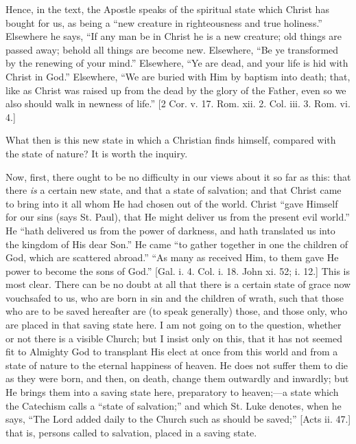 Hence, in the text, the Apostle speaks of the spiritual state which
Christ has bought for us, as being a ``new creature in
righteousness and true holiness.'' Elsewhere he says, ``If any
man be in Christ he is a new creature; old things are passed away;
behold all things are become new. Elsewhere, ``Be ye transformed
by the renewing of your mind.'' Elsewhere, ``Ye are dead, and
your life is hid with Christ in God.'' Elsewhere, ``We are
buried with Him by baptism into death; that, like as Christ was raised
up from the dead by the glory of the Father, even so we also should
walk in newness of life.'' [2 Cor. v. 17. Rom. xii. 2. Col. iii.
3. Rom. vi. 4.]

What then is this new state in which a Christian finds himself,
compared with the state of nature? It is worth the inquiry.

Now, first, there ought to be no difficulty in our views about it
so far as this: that there \emph{is} a certain new state, and that a
state of salvation; and that Christ came to bring into it all whom He
had chosen out of the world. Christ ``gave Himself for our sins
(says St. Paul), that He might deliver us from the present evil
world.'' He ``hath delivered us from the power of darkness,
and hath translated us into the kingdom of His dear Son.'' He came
``to gather together in one the children of God, which are
scattered abroad.'' ``As many as received Him, to them gave He
power to become the sons of God.'' [Gal. i. 4. Col. i. 18. John xi.
52; i. 12.] This is most clear. There can be no doubt at all that
there is a certain state of grace now vouchsafed to us, who are born
in sin and the children of wrath, such that those who are to be saved
hereafter are (to speak generally) those, and those only, who are
placed in that saving state here. I am not going on to the question,
whether or not there is a visible Church; but I insist only on this,
that it has not seemed fit to Almighty God to transplant His elect at
once from this world and from a state of nature to the eternal
happiness of heaven. He does not suffer them to die as they were born,
and then, on death, change them outwardly and inwardly; but He brings
them into a saving state here, preparatory to heaven;—a state which
the Catechism calls a ``state of salvation;'' and which St.
Luke denotes, when he says, ``The Lord added daily to the Church
such as should be saved;'' [Acts ii. 47.] that is, persons called
to salvation, placed in a saving state.

